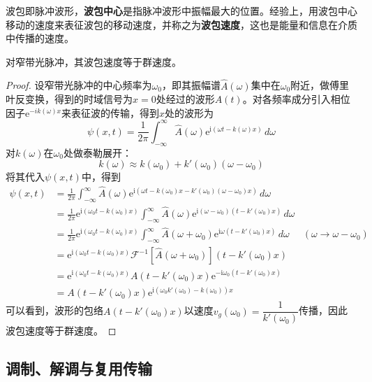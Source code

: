 \documentclass{ctexbook}
\begin{document}
\begin{definition}
    波包即脉冲波形，\textbf{波包中心}是指脉冲波形中振幅最大的位置。经验上，用波包中心移动的速度来表征波包的移动速度，并称之为\textbf{波包速度}，这也是能量和信息在介质中传播的速度。
\end{definition}
\begin{proposition}
    对窄带光脉冲，其波包速度等于群速度。
\end{proposition}
\begin{proof}
设窄带光脉冲的中心频率为$\omega_0$，即其振幅谱$\hat{A}(\omega)$集中在$\omega_0$附近，做傅里叶反变换，得到的时域信号为$x=0$处经过的波形$A(t)$。对各频率成分引入相位因子$\mathrm{e}^{-ik(\omega)x}$来表征波的传输，得到$x$处的波形为
\[\psi(x,t)=\frac{1}{2\pi}\int_{-\infty}^{\infty}\hat{A}(\omega)\mathrm{e}^{\mathrm{i}(\omega t-k(\omega)x)}\,d\omega\]
对$k(\omega)$在$\omega_0$处做泰勒展开：
\[k(\omega)\approx k(\omega_0)+k'(\omega_0)(\omega-\omega_0)\]
将其代入$\psi(x,t)$中，得到
\begin{align*}
    \psi(x,t)&=\frac{1}{2\pi}\int_{-\infty}^{\infty}\hat{A}(\omega)\mathrm{e}^{\mathrm{i}(\omega t-k(\omega_0)x-k'(\omega_0)(\omega-\omega_0)x)}\,d\omega\\
    &=\frac{1}{2\pi}\mathrm{e}^{\mathrm{i}(\omega_0 t-k(\omega_0)x)}\int_{-\infty}^{\infty}\hat{A}(\omega)\mathrm{e}^{\mathrm{i}(\omega - \omega_0)(t - k'(\omega_0)x)}\,d\omega\\
    &=\frac{1}{2\pi}\mathrm{e}^{\mathrm{i}(\omega_0 t-k(\omega_0)x)}\int_{-\infty}^{\infty}\hat{A}(\omega+\omega_0)\mathrm{e}^{\mathrm{i}\omega(t - k'(\omega_0)x)}\,d\omega&(\omega\to\omega-\omega_0)\\
    &=\mathrm{e}^{\mathrm{i}(\omega_0 t-k(\omega_0)x)}\mathcal{F}^{-1}[\hat{A}(\omega+\omega_0)]\left(t - k'(\omega_0)x\right)\\
    &=\mathrm{e}^{\mathrm{i}(\omega_0 t-k(\omega_0)x)}A\left(t - k'(\omega_0)x\right)\mathrm{e}^{-\mathrm{i}\omega_0 (t- k'(\omega_0)x)}\\
    &=A\left(t - k'(\omega_0)x\right)\mathrm{e}^{\mathrm{i}(\omega_0 k'(\omega_0)-k(\omega_0))x}
\end{align*}
可以看到，波形的包络$A\left(t - k'(\omega_0)x\right)$以速度$v_g(\omega_0)=\dfrac{1}{k'(\omega_0)}$传播，因此波包速度等于群速度。
\end{proof}

\subsection{调制、解调与复用传输}\label{sub:modulation}
\end{document}
